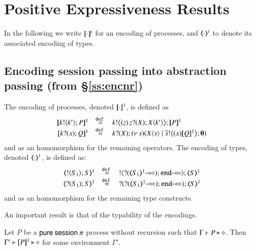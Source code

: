 
\section{Positive Expressiveness Results}
In the following we write $[\!\![\cdot]\!\!]^i$ for an encoding of processes, and $\langle\!\!\langle\cdot\rangle\!\!\rangle^i$ to denote its associated encoding of types.

\subsection{Encoding session passing into abstraction passing (from \S\ref{ss:encnr})}

\begin{definition}
The encoding of processes, denoted $[\!\![\cdot]\!\!]^1$, is defined as 
\[
	\begin{array}{rcl}
		\pmap{\bout{k}{k'} P}{1}	&\defeq&	\bbout{k}{ \abs{z}{\,\binp{z}{X} \appl{X}{k'}} } \pmap{P}{1} \\
		\pmap{\binp{k}{x} Q}{1}	&\defeq&	\binp{k}{X} \newsp{s}{\appl{X}{s} \Par \bbout{\dual{s}}{\abs{x} \pmap{Q}{1}} \inact}
	\end{array}
\]
and as an homomorphism for the remaining operators. The encoding of types, denoted $\langle\!\!\langle\cdot\rangle\!\!\rangle^1$, is defined as:
\[
	\begin{array}{rcl}
		\tmap{\btout{S_1} {S} }{1}	&\defeq&	\btout{\lhot{\btinp{\lhot{\tmap{S_1}{1}}}\tinact}} \tmap{S}{1}  \\
		\tmap{\btinp{S_1} S }{1}	&\defeq&	\btinp{\lhot{\btinp{\lhot{\tmap{S_1}{1}}}\tinact}} \tmap{S}{1} 
	\end{array}
\]
and as an homomorphism for the remaining type constructs.
\end{definition}

An important result is that of the typability of the encodings.

\begin{proposition}
	Let $P$ be a $\mathsf{pure\ session\ }\pi$ process without recursion such that $\Gamma \vdash P \triangleright \diamond$. 
	Then $\Gamma' \vdash [\!\![P]\!\!]^1 \triangleright \diamond$
	for some environment $\Gamma'$.
\end{proposition}

